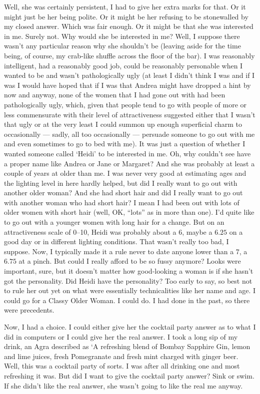 Well, she was certainly persistent, I had to give her extra marks
for that. Or it might just be her being
polite. Or it might be her refusing to be stonewalled by my closed
answer. Which was fair enough. Or it might be that she was
interested in me. Surely not. Why would she be interested in me?
Well, I suppose there wasn't any particular reason why she
{\twelveit shouldn't\/} be (leaving aside for the time being, of
course, my crab-like shuffle across the floor of the bar). I was
reasonably intelligent, had a reasonably good job, could be
reasonably personable when I wanted to be and wasn't pathologically
ugly (at least I didn't think I was and if I was I would have hoped
that if I was that Andrea might have dropped a hint by now and
anyway, none of the women that I had gone out with had been
pathologically ugly, which, given that people tend to go with people
of more or less commensurate with their level of attractiveness
suggested either that I wasn't {\twelveit that\/} ugly or at the
very least I could summon up enough superficial charm to
occasionally --- sadly, all too occasionally --- persuade someone to
go out with me and even sometimes to go to bed with me). It was just
a question of whether I wanted someone called `Heidi' to be
interested in me. Oh, why couldn't see have a proper name like
Andrea or Jane or Margaret? And she was probably at least a couple
of years at older than me. I was never very good at estimating ages
and the lighting level in here hardly helped, but did I really want
to go out with another older woman? And she had short hair and did I
really want to go out with another woman who had short hair? I mean
I had been out with lots of older women with short hair (well, OK,
``lots'' as in more than one). I'd quite like to go out with a
younger women with long hair for a change. But on an attractiveness
scale of 0--10, Heidi was probably about a $6$, maybe a $6.25$ on a
good day or in different lighting conditions. That wasn't really too
bad, I suppose. Now, I typically made it a rule never to date anyone
lower than a $7$, a $6.75$ at a pinch. But could I really afford to
be so fussy anymore? Looks were important, sure, but it doesn't
matter how good-looking a woman is if she hasn't got the
personality. Did Heidi have the personality? Too early to say, so
best not to rule her out yet on what were essentially technicalities
like her name and age. I could go for a Classy Older Woman. I could
do. I had done in the past, so there were precedents.

Now, I had a choice. I could either give her the cocktail party
answer as to what I did in computers or I could give her the real
answer. I took a long sip of my drink, an Agra described as `A
refreshing blend of Bombay Sapphire Gin, lemon and lime juices,
fresh Pomegranate and fresh mint charged with ginger beer. Well,
this was a cocktail party of sorts. I was after all drinking one and
most refreshing it was. But did I want to give the cocktail party
answer? Sink or swim. If she didn't like the real answer, she wasn't
going to like the real me anyway.

